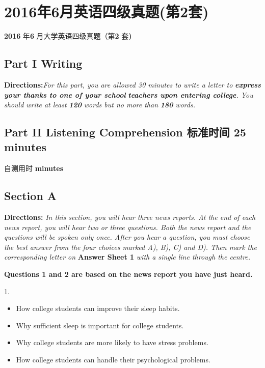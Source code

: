 \documentclass[UTF8,11pt]{ctexart}
\begin{document}
\section*{2016年6月英语四级真题(第2套)}
\textbf{2016} 年\textbf{6} 月大学英语四级真题（第\textbf{2} 套\textbf{)}


\subsection*{\textbf{Part I} \textbf{Writing}}


\textbf{Directions:}\textit{For this part, you are allowed 30 minutes to write a letter to}\textbf{\textit{ express your thanks to one of your school}} \textbf{\textit{teachers upon entering college}}\textit{. You should write at least}\textbf{\textit{ 120}}\textit{ words but no more than}\textbf{\textit{ 180}}\textit{ words.}


\subsection*{\textbf{Part} II \textbf{Listening Comprehension} 标准时间 \textbf{25 minutes}}


自测用时 \textbf{minutes}


\subsection*{\textbf{Section A}}


\textbf{Directions:}\textit{ In this section, you will hear three news reports. At the end of each news report, you will hear two or} \textit{three questions. Both the news report and the questions will be spoken only once. After you hear a question, you must} \textit{choose the best answer from the four choices marked A), B), C) and D). Then mark the corresponding letter on} \textbf{Answer Sheet 1}\textit{ with a single line through the centre.}


\textbf{Questions 1 and 2 are based on the news report you have just heard.}


1.


\begin{itemize}[leftmargin=2em,itemsep=.2em,topsep=.4em]\item[A.] How college students can improve their sleep habits.
\item[B.] Why sufficient sleep is important for college students.
\item[C.] Why college students are more likely to have stress problems.
\item[D.] How college students can handle their psychological problems.
\end{itemize}
\end{document}
